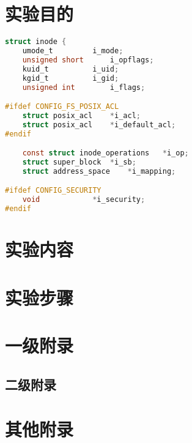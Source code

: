 \documentclass[lang=cn,11pt,a4paper,cite=super]{whureport}
\begin{document}
\makeheader



\section{实验目的}
\begin{lstlisting}[language=c]
struct inode {
	umode_t			i_mode;
	unsigned short		i_opflags;
	kuid_t			i_uid;
	kgid_t			i_gid;
	unsigned int		i_flags;

#ifdef CONFIG_FS_POSIX_ACL
	struct posix_acl	*i_acl;
	struct posix_acl	*i_default_acl;
#endif

	const struct inode_operations	*i_op;
	struct super_block	*i_sb;
	struct address_space	*i_mapping;

#ifdef CONFIG_SECURITY
	void			*i_security;
#endif
\end{lstlisting}


\section{实验内容}



\section{实验步骤}






\nocite{*}


\appendix
\addappheadtotoc
\section{一级附录}
\subsection{二级附录}


\section{其他附录}
\end{document}

